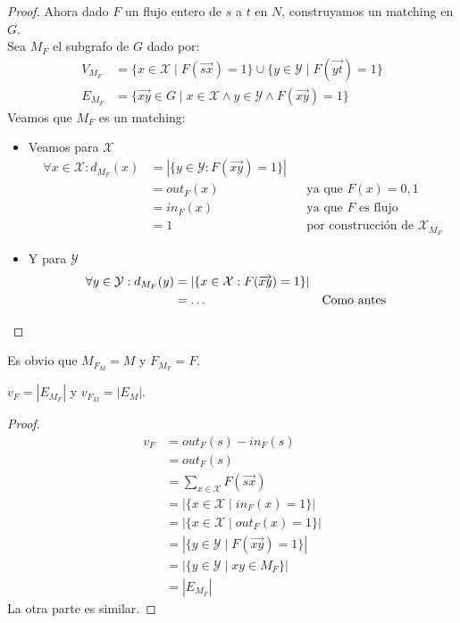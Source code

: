\begin{proof}
Ahora dado $F$ un flujo entero de $s$ a $t$ en $N$, construyamos un matching en $G$.\\
Sea $M_F$ el subgrafo de $G$ dado por:
\begin{align}
    V_{M_F} &= \{x\in\mathcal{X} \mid F(\overrightarrow{sx}) = 1\} \cup \{y\in\mathcal{Y}\mid F(\overrightarrow{yt}) = 1\}\\
    E_{M_F} &= \{\overrightarrow{xy} \in G \mid x \in \mathcal{X} \wedge y \in \mathcal{Y} \wedge F(\overrightarrow{xy}) = 1\}
\end{align}
Veamos que $M_F$ es un matching:
\begin{itemize}
    \item Veamos para $\mathcal{X}$
    \begin{align}
    \forall x \in \mathcal{X} : d_{M_F}(x) &= \left| \{ y \in \mathcal{Y} : F(\overrightarrow{xy}) = 1 \} \right|\\
    &= out_F(x) && \text{ya que $F(x) = 0, 1$}\\
    &= in_F(x)  && \text{ya que $F$ es flujo}\\
    &= 1 && \text{por construcción de $\mathcal{X}_{M_F}$}
    \end{align}
    \item Y para $\mathcal{Y}$
    \begin{align}
    \forall y \in \mathcal{Y} : d_{M_F}(y) &= \left| \{ x \in \mathcal{X} : F(\overrightarrow{xy}) = 1 \} \right|\\
    &= \mathellipsis && \text{Como antes}
    \end{align}
\end{itemize}
\end{proof}
Es obvio que $M_{F_M} = M$ y $F_{M_F} = F$.

\begin{proposition}\label{flujo_iso_matching}
$v_F = \left| E_{M_F} \right|$ y $v_{F_M} = \left| E_{M} \right|$. 
\end{proposition}
\begin{proof}
\begin{align}
    v_{F}
    &= out_{F}(s) - in_{F}(s)\\
    &= out_{F}(s)\\
    &= \sum_{x \in \mathcal{X}} F(\overrightarrow{sx})\\
    &= \left| \{ x \in \mathcal{X} \mid in_F(x) = 1 \} \right|\\
    &= \left| \{ x \in \mathcal{X} \mid out_F(x) = 1 \} \right|\\
    &= \left| \{ y \in \mathcal{Y} \mid F(\overrightarrow{xy}) = 1 \} \right|\\
    &= \left| \{ y \in \mathcal{Y} \mid xy \in M_F \} \right|\\
    &= \left| E_{M_F} \right|
\end{align}
La otra parte es similar.
\end{proof}

